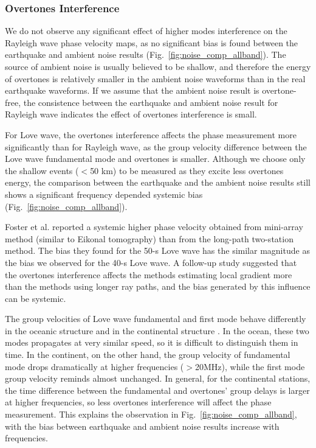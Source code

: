 \documentclass[referee]{gji}
\begin{document}
\subsubsection{Overtones Interference}
\label{sec:overtone}

We do not observe any significant effect of higher modes interference on the Rayleigh wave phase velocity maps, as no significant bias is found between the earthquake and ambient noise results (Fig.~\ref{fig:noise_comp_allband}). The source of ambient noise is usually believed to be shallow, and therefore the energy of overtones is relatively smaller in the ambient noise waveforms than in the real earthquake waveforms. If we assume that the ambient noise result is overtone-free, the consistence between the earthquake and ambient noise result for Rayleigh wave indicates the effect of overtones interference is small.

For Love wave, the overtones interference affects the phase measurement more significantly than for Rayleigh wave, as the group velocity difference between the Love wave fundamental mode and overtones is smaller. Although we choose only the shallow events ($<$50 km) to be measured as they excite less overtones energy, the comparison between the earthquake and the ambient noise results still shows a significant frequency depended systemic bias (Fig.~\ref{fig:noise_comp_allband}).

Foster et al.  reported a systemic higher phase velocity obtained from mini-array method (similar to Eikonal tomography) than from the long-path two-station method. The bias they found for the 50-s Love wave has the similar magnitude as the bias we observed for the 40-s Love wave. A follow-up study \cite{Foster:2014oi} suggested that the overtones interference affects the methods estimating local gradient more than the methods using longer ray paths, and the bias generated by this influence can be systemic.

The group velocities of Love wave fundamental and first mode behave differently in the oceanic structure and in the continental structure \cite{Nettles:2011}. In the ocean, these two modes propagates at very similar speed, so it is difficult to distinguish them in time. In the continent, on the other hand, the group velocity of fundamental mode drops dramatically at higher frequencies ($>$20MHz), while the first mode group velocity reminds almost unchanged. In general, for the continental stations, the time difference between the fundamental and overtones’ group delays is larger at higher frequencies, so less overtones interference will affect the phase measurement. This explains the observation in Fig.~\ref{fig:noise_comp_allband}, with the bias between earthquake and ambient noise results increase with frequencies. 
\end{document}
